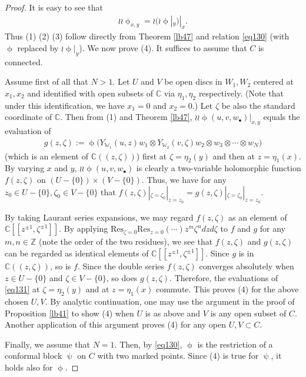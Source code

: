 \documentclass[12pt,a4paper,notitlepage]{report}
\theoremstyle{definition}
\theoremstyle{plain}
\newcommand{\Res}{\mathrm{Res}}
\newcommand{\blt}{\bullet}
\newcommand{\Wbb}{\mathbb W}
\newcommand{\Cbb}{\mathbb C}
\newcommand{\Zbb}{\mathbb Z}
\numberwithin{equation}{section}
\begin{document}
\begin{proof}
It is easy to see that
\begin{align}
\wr\wr\upphi_{x,y}=\wr(\wr\upphi|_y)|_x.
\end{align}
Thus (1) (2) (3) follow directly from Theorem \ref{lb47} and relation \eqref{eq130} (with $\upphi$ replaced by $\wr\upphi|_y$). We now prove (4). It suffices to assume that $C$ is connected.

Assume first of all that $N>1$. Let $U$ and $V$ be open discs in $W_1,W_2$ centered at $x_1,x_2$ and identified with open subsets of $\Cbb$ via $\eta_1,\eta_2$ respectively. (Note that under this identification, we have $x_1=0$ and $x_2=0$.) Let $\zeta$ be also the standard coordinate of $\Cbb$. Then from (1) and Theorem \ref{lb47}, $\wr\wr\upphi(u,v,w_\blt)\big|_{x,y}$ equals the evaluation of 
\begin{align}
g(z,\zeta):=\upphi\big(Y_{\Wbb_1}(u,z)w_1\otimes Y_{\Wbb_2}(v,\zeta)w_2\otimes w_3\otimes\cdots\otimes w_N\big)\label{eq131}
\end{align}
(which is an element of $\Cbb((z,\zeta))$) first at $\zeta=\eta_2(y)$ and then at $z=\eta_1(x)$. By varying $x$ and $y$, $\wr\wr\upphi(u,v,w_\blt)$ is clearly a two-variable holomorphic function $f(z,\zeta)$ on $(U-\{0\})\times (V-\{0\})$. Thus, we have for any $z_0\in U-\{0\},\zeta_0\in V-\{0\}$ that $f(z,\zeta)|_{\zeta=\zeta_0}|_{z=z_0}=g(z,\zeta)|_{\zeta=\zeta_0}|_{z=z_0}$.

By taking Laurant series expansions, we may regard $f(z,\zeta)$ as an element of $\Cbb[[z^{\pm 1},\zeta^{\pm 1}]]$.  By applying $\Res_{\zeta=0}\Res_{z=0}(\cdots)z^m\zeta^ndzd\zeta$ to $f$ and $g$ for any $m,n\in\Zbb$ (note the order of the two residues), we see that $f(z,\zeta)$ and $g(z,\zeta)$ can be regarded as identical elements of $\Cbb[[z^{\pm 1},\zeta^{\pm1}]]$. Since $g$ is in $\Cbb((z,\zeta))$, so is $f$. Since the double series $f(z,\zeta)$  converges absolutely when $z\in U-\{0\}$ and $\zeta\in V-\{0\}$, so does $g(z,\zeta)$. Therefore, the evaluations of \eqref{eq131} at $\zeta=\eta_2(y)$ and at $z=\eta_1(x)$ commute. This proves (4) for the above chosen $U,V$. By analytic continuation, one may use the argument in the proof of Proposition \ref{lb41} to show (4) when $U$ is as above and $V$ is any open subset of $C$. Another application of this argument proves (4) for any open $U,V\subset C$.

Finally, we assume that $N=1$. Then, by \eqref{eq130}, $\upphi$ is the restriction of a conformal block $\uppsi$ on $C$ with two marked points. Since (4) is true for $\uppsi$, it holds also for $\upphi$.
\end{proof}
\end{document}
